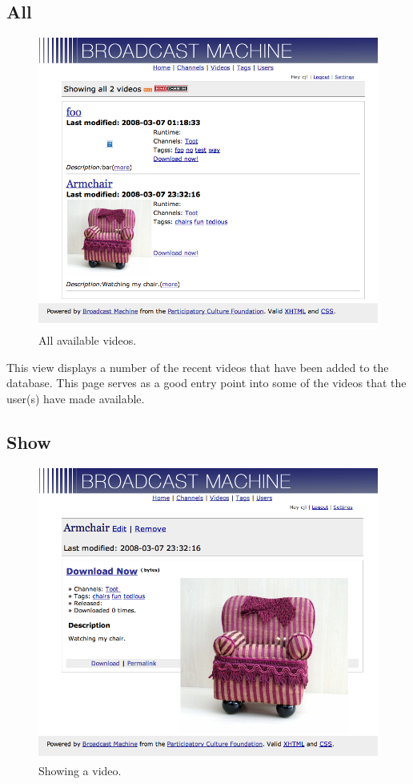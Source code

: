 \documentclass[a4paper,12pt]{report}
\begin{document}
\subsection{All}
\begin{figure}[h]
\begin{center}
\includegraphics[width=150mm]{./images/videoall.png}
\end{center}
\caption{All available videos.}
\end{figure}

This view displays a number of the recent videos that have been added to the database.
This page serves as a good entry point into some of the videos that the user(s) have made available.

\subsection{Show}
\begin{figure}[h]
\begin{center}
\includegraphics[width=150mm]{./images/videoshow.png}
\end{center}
\caption{Showing a video.}
\end{figure}
\end{document}

